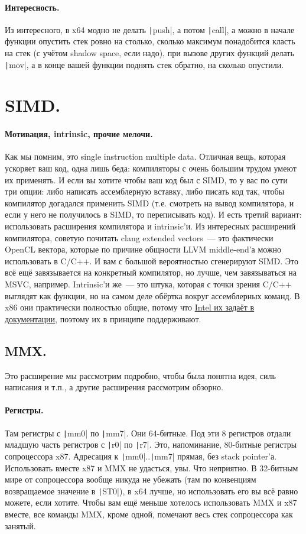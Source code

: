\documentclass{article}
\begin{document}
    \paragraph{Интересность.}
    Из интересного, в x64 модно не делать \texttt|push|, а потом \texttt|call|, а можно в начале функции опустить стек ровно на столько, сколько максимум понадобится класть на стек (с учётом shadow space, если надо), при вызове других функций делать \texttt|mov|, а в конце вашей функции поднять стек обратно, на сколько опустили.
    \section{SIMD.}
    \paragraph{Мотивация, intrinsic, прочие мелочи.}
    Как мы помним, это single instruction multiple data. Отличная вещь, которая ускоряет ваш код, одна лишь беда: компиляторы с очень большим трудом умеют их применять. И если вы хотите чтобы ваш код был с SIMD, то у вас по сути три опции: либо написать ассемблерную вставку, либо писать код так, чтобы компилятор догадался применить SIMD (т.е. смотреть на вывод компилятора, и если у него не получилось в SIMD, то переписывать код). И есть третий вариант: использовать расширения компилятора и intrinsic'и. Из интересных расширений компилятора, советую почитать clang extended vectors~--- это фактически OpenCL вектора, которые по причине общности LLVM middle-end'а можно использовать в C/C++. И вам с большой вероятностью сгенерируют SIMD. Это всё ещё завязывается на конкретный компилятор, но лучше, чем завязываться на MSVC, например. Intrinsic'и же~--- это штука, которая с точки зрения C/C++ выглядят как функции, но на самом деле обёртка вокруг ассемблерных команд. В x86 они практически полностью общие, потому что \href{https://www.intel.com/content/www/us/en/docs/intrinsics-guide/index.html}{Intel их задаёт в документации}, поэтому их в принципе поддерживают.
    \subsection{MMX.}
    Это расширение мы рассмотрим подробно, чтобы была понятна идея, силь написания и т.п., а другие расширения рассмотрим обзорно.\\
    \paragraph{Регистры.}
    Там регистры с \texttt|mm0| по \texttt|mm7|. Они 64-битные. Под эти 8 регистров отдали младшую часть регистров с \texttt|r0| по \texttt|r7|. Это, напоминание, 80-битные регистры сопроцессора x87. Адресация к \texttt|mm0|..\texttt|mm7| прямая, без stack pointer'а. Использовать вместе x87 и MMX не удасться, увы. Что неприятно. В 32-битным мире от сопроцессора вообще никуда не убежать (там по конвенциям возвращаемое значение в \texttt|ST0|), в x64 лучше, но использовать его вы всё равно можете, если хотите. Чтобы вам ещё меньше хотелось использовать MMX и x87 вместе, все команды MMX, кроме одной, помечают весь стек сопроцессора как занятый.
\end{document}
